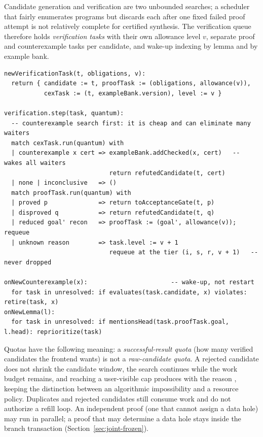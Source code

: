 Candidate generation and verification are two unbounded searches; a scheduler that fairly enumerates programs but discards each after one fixed failed proof attempt is not relatively complete for certified synthesis. The verification queue therefore holds \emph{verification tasks} with their own allowance level $v$, separate proof and counterexample tasks per candidate, and wake-up indexing by lemma and by example bank.
\begin{lstlisting}
newVerificationTask(t, obligations, v):
  return { candidate := t, proofTask := (obligations, allowance(v)),
           cexTask := (t, exampleBank.version), level := v }

verification.step(task, quantum):
  -- counterexample search first: it is cheap and can eliminate many waiters
  match cexTask.run(quantum) with
  | counterexample x cert => exampleBank.addChecked(x, cert)   -- wakes all waiters
                             return refutedCandidate(t, cert)
  | none | inconclusive   => ()
  match proofTask.run(quantum) with
  | proved p              => return toAcceptanceGate(t, p)
  | disproved q           => return refutedCandidate(t, q)
  | reduced goal' recon   => proofTask := (goal', allowance(v)); requeue
  | unknown reason        => task.level := v + 1
                             requeue at the tier (i, s, r, v + 1)   -- never dropped

onNewCounterexample(x):                       -- wake-up, not restart
  for task in unresolved: if evaluates(task.candidate, x) violates: retire(task, x)
onNewLemma(l):
  for task in unresolved: if mentionsHead(task.proofTask.goal, l.head): reprioritize(task)
\end{lstlisting}
Quotas have the following meaning: a \emph{successful-result quota} (how many verified candidates the frontend wants) is not a \emph{raw-candidate quota}. A rejected candidate does not shrink the candidate window, the search continues while the work budget remains, and reaching a user-visible cap produces  with the reason , keeping the distinction between an algorithmic impossibility and a resource policy. Duplicates and rejected candidates still consume work and do not authorize a refill loop. An independent proof (one that cannot assign a data hole) may run in parallel; a proof that may determine a data hole stays inside the branch transaction (Section~\ref{sec:joint-frozen}).

